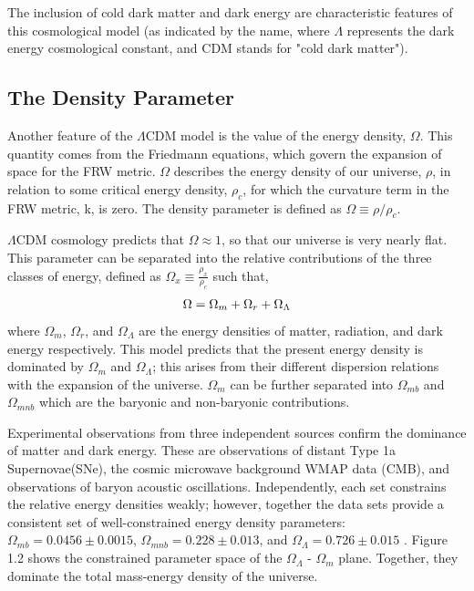 \documentclass{report}
\begin{document}
The inclusion of cold dark matter and dark energy are characteristic features of this cosmological model (as indicated by the name, where $\Lambda$ represents the dark energy cosmological constant, and CDM stands for "cold dark matter").

\subsection{The Density Parameter}

Another feature of the $\Lambda$CDM model is the value of the energy density, $\Omega$. This quantity comes from the Friedmann equations, which govern the expansion of space for the FRW metric. $\Omega$ describes the energy density of our universe, $\rho$, in relation to some critical energy density, $\rho_c$, for which the curvature term in the FRW metric, k, is zero. The density parameter is defined as $\Omega \equiv \rho/\rho_c$.

$\Lambda$CDM cosmology predicts that $\Omega \approx 1$, so that our universe is very nearly flat. This parameter can be separated into the relative contributions of the three classes of energy, defined as $\Omega_{x} \equiv \frac{\rho_{x}}{\rho_{c}}$  such that,
\begin{eqnarray}
\centering
\Omega = \Omega_{m} + \Omega_{r} + \Omega_{\Lambda}
\end{eqnarray}
where $\Omega_{m}$, $\Omega_{r}$, and $\Omega_{\Lambda}$ are the energy densities of matter, radiation, and dark energy respectively. This model predicts that the present energy density is dominated by $\Omega_{m}$ and $\Omega_{\Lambda}$; this arises from their different dispersion relations with the expansion of the universe. $\Omega_{m}$ can be further separated into $\Omega_{mb}$ and $\Omega_{mnb}$ which are the baryonic and non-baryonic contributions.

Experimental observations from three independent sources confirm the dominance of matter and dark energy. These are observations of distant Type 1a Supernovae(SNe), the cosmic microwave background WMAP data (CMB), and observations of baryon acoustic oscillations. Independently, each set constrains the relative energy densities weakly; however, together the data sets provide a consistent set of well-constrained energy density parameters: $\Omega_{mb} = 0.0456 \pm 0.0015$, $\Omega_{mnb} = 0.228 \pm 0.013$, and $\Omega_{\Lambda} = 0.726 \pm 0.015$ \cite{Komatsu2008}. Figure 1.2 shows the constrained parameter space of the $\Omega_{\Lambda}$ - $\Omega_{m}$ plane. Together, they dominate the total mass-energy density of the universe.
\end{document}

